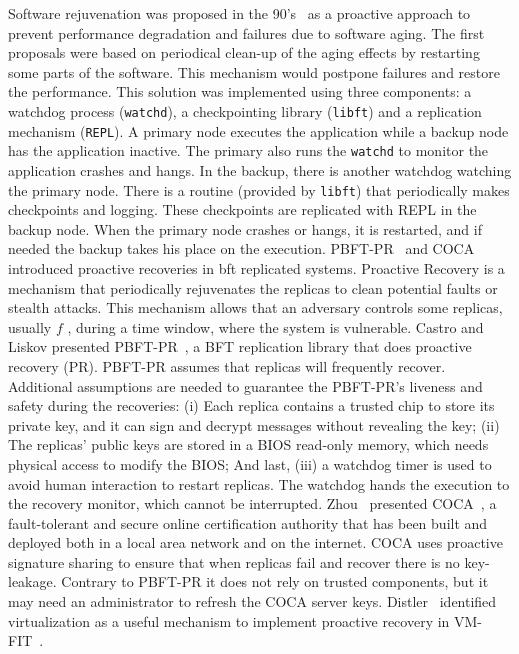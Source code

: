 Software rejuvenation was proposed in the 90's~\cite{Huang:1993,Huang:1995} as a proactive approach to prevent performance degradation and failures due to software aging. 
The first proposals were based on periodical clean-up of the aging effects by restarting some parts of the software. 
This mechanism would postpone failures and restore the performance. 
This solution was implemented using three components: a watchdog process (\texttt{watchd}), a checkpointing library (\texttt{libft}) and a replication mechanism (\texttt{REPL}). 
A primary node executes the application while a backup node has the application inactive. 
The primary also runs the \texttt{watchd} to monitor the application crashes and hangs. 
In the backup, there is another watchdog watching the primary node. 
There is a routine (provided by \texttt{libft}) that periodically makes checkpoints and logging. 
These checkpoints are replicated with REPL in the backup node. 
When the primary node crashes or hangs, it is restarted, and if needed the backup takes his place on the execution.
PBFT-PR~\cite{Castro:2002} and COCA~\cite{Zhou:2002} introduced proactive recoveries in \gls{bft} replicated systems. 
Proactive Recovery is a mechanism that periodically rejuvenates the replicas to clean potential faults or stealth attacks. 
This mechanism allows that an adversary controls some replicas, usually $f$ , during a time window, where the system is vulnerable.
Castro and Liskov presented PBFT-PR~\cite{Castro:2002}, a BFT replication library that does proactive recovery (PR). 
PBFT-PR assumes that replicas will frequently recover. 
Additional assumptions are needed to guarantee the PBFT-PR's liveness and safety during the recoveries: 
(i) Each replica contains a trusted chip to store its private key, and it can sign and decrypt messages without revealing the key; 
(ii) The replicas’ public keys are stored in a BIOS read-only memory, which needs physical access to modify the BIOS; 
And last, (iii) a watchdog timer is used to avoid human interaction to restart replicas. 
The watchdog hands the execution to the recovery monitor, which cannot be interrupted.
Zhou~\etal{} presented COCA~\cite{Zhou:2002}, a fault-tolerant and secure online certification authority that has been built and deployed both in a local area network and on the internet.
COCA uses proactive signature sharing to ensure that when replicas fail and recover there
is no key-leakage. Contrary to PBFT-PR it does not rely on trusted components, but it may
need an administrator to refresh the COCA server keys.
Distler~\etal{} identified virtualization as a useful mechanism to implement proactive recovery in VM-FIT~\cite{Reiser:2007,Distler:2008}. 
